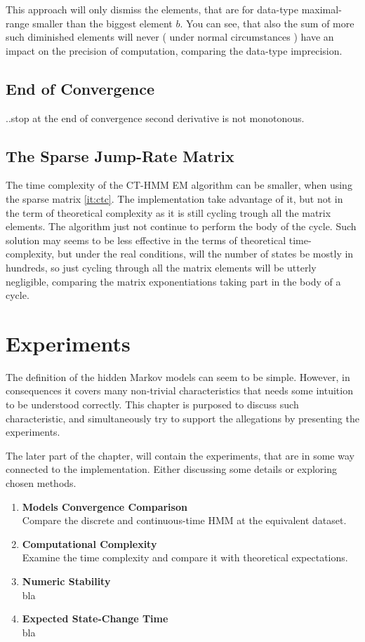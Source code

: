 \documentclass[thesis=M,english]{FITthesis}[2012/10/20]
\begin{document}
This approach will only dismiss the elements, that are for data-type maximal-range smaller than the biggest element $b$. You can see, that also the sum of more such diminished elements will never ( under normal circumstances ) have an impact on the precision of computation, comparing the data-type imprecision.     

\section{End of Convergence}
..stop at the end of convergence
second derivative is not monotonous. 

\section{The Sparse Jump-Rate Matrix}

The time complexity of the CT-HMM EM algorithm can be smaller, when using the sparse matrix \ref{it:ctc}. The implementation take advantage of it, but not in the term of theoretical complexity as it is still cycling trough all the matrix elements. The algorithm just not continue to perform the body of the cycle. Such solution may seems to be less effective in the terms of theoretical time-complexity, but under the real conditions, will the number of states be mostly in hundreds, so just cycling through all the matrix elements will be utterly negligible, comparing the matrix exponentiations taking part in the body of a cycle.   
 

\chapter{Experiments}

The definition of the hidden Markov models can seem to be simple. However, in consequences it covers many non-trivial characteristics that needs some intuition to be understood correctly. This chapter is purposed to discuss such characteristic, and simultaneously try to support the allegations by presenting the experiments.

The later part of the chapter, will contain the experiments, that are in some way connected to the implementation. Either discussing some details or exploring chosen methods.       

\begin{enumerate}[resume]
\setcounter{enumi}{0}
\item \textbf{Models Convergence Comparison} \\
Compare the discrete and continuous-time HMM at the equivalent dataset.
\item \textbf{Computational Complexity} \\
Examine the time complexity and compare it with theoretical expectations.
\item \textbf{Numeric Stability} \\
bla
\item \textbf{Expected State-Change Time} \\
bla

\end{enumerate}
\end{document}
